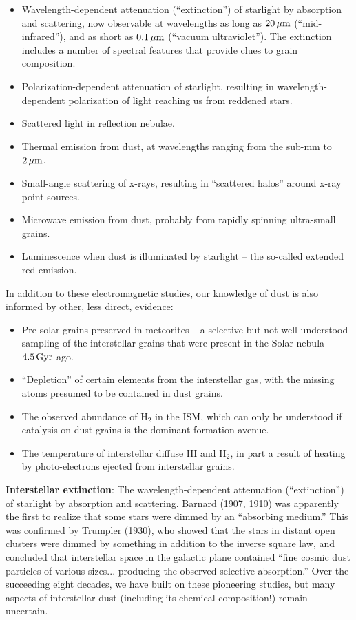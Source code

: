 \documentclass[a4paper,10pt]{article}
\begin{document}
\begin{itemize}
    \item Wavelength-dependent attenuation (``extinction'') of starlight by absorption and scattering, now observable at wavelengths as long as $20\,\mu{\rm m}$ (``mid-infrared''), and as short as $0.1\,\mu{\rm m}$ (``vacuum ultraviolet''). The extinction includes a number of spectral features that provide clues to grain composition.
    \item Polarization-dependent attenuation of starlight, resulting in wavelength-dependent polarization of light reaching us from reddened stars.
    \item Scattered light in reflection nebulae.
    \item Thermal emission from dust, at wavelengths ranging from the sub-mm to $2\,\mu{\rm m}$.
    \item Small-angle scattering of x-rays, resulting in ``scattered halos'' around x-ray point sources.
    \item Microwave emission from dust, probably from rapidly spinning ultra-small grains.
    \item Luminescence when dust is illuminated by starlight -- the so-called extended red emission.
\end{itemize}

{\noindent}In addition to these electromagnetic studies, our knowledge of dust is also informed by other, less direct, evidence:

\begin{itemize}
    \item Pre-solar grains preserved in meteorites -- a selective but not well-understood sampling of the interstellar grains that were present in the Solar nebula $4.5\,{\rm Gyr}$ ago.
    \item ``Depletion'' of certain elements from the interstellar gas, with the missing atoms presumed to be contained in dust grains.
    \item The observed abundance of H$_2$ in the ISM, which can only be understood if catalysis on dust grains is the dominant formation avenue.
    \item The temperature of interstellar diffuse HI and H$_2$, in part a result of heating by photo-electrons ejected from interstellar grains.
\end{itemize}

{\noindent}\textbf{Interstellar extinction}: The wavelength-dependent attenuation (``extinction'') of starlight by absorption and scattering. Barnard (1907, 1910) was apparently the first to realize that some stars were dimmed by an ``absorbing medium.'' This was confirmed by Trumpler (1930), who showed that the stars in distant open clusters were dimmed by something in addition to the inverse square law, and concluded that interstellar space in the galactic plane contained ``fine cosmic dust particles of various sizes... producing the observed selective absorption.'' Over the succeeding eight decades, we have built on these pioneering studies, but many aspects of interstellar dust (including its chemical composition!) remain uncertain. 
\end{document}
